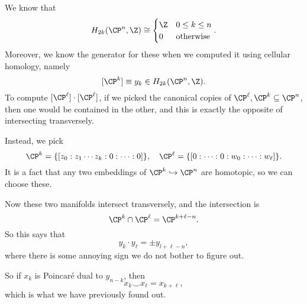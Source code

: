 \documentclass[a4paper]{article}
\theoremstyle{definition}
\begin{document}
\begin{eg}
  We know that
  \[
    H_{2k}(\CP^n, \Z) \cong
    \begin{cases}
      \Z & 0 \leq k \leq n\\
      0 & \text{otherwise}
    \end{cases}.
  \]
  Moreover, we know the generator for these when we computed it using cellular homology, namely
  \[
    [\CP^k] \equiv y_k \in H_{2k}(\CP^n, \Z).
  \]
  To compute $[\CP^\ell] \cdot [\CP^\ell]$, if we picked the canonical copies of $\CP^\ell, \CP^k \subseteq \CP^n$, then one would be contained in the other, and this is exactly the opposite of intersecting transversely.

  Instead, we pick
  \[
    \CP^k = \{[z_0:z_1 \cdots z_k:0:\cdots:0]\},\quad \CP^\ell = \{[0:\cdots : 0 : w_0 : \cdots : w_\ell]\}.
  \]
  It is a fact that any two embeddings of $\CP^k \hookrightarrow \CP^n$ are homotopic, so we can choose these.

  Now these two manifolds intersect transversely, and the intersection is
  \[
    \CP^k \cap \CP^\ell = \CP^{k + \ell - n}.
  \]
  So this says that
  \[
    y_k \cdot y_\ell = \pm y_{l + \ell - n},
  \]
  where there is some annoying sign we do not bother to figure out.

  So if $x_k$ is Poincar\'e dual to $y_{n - k}$, then
  \[
    x_k \smile x_\ell = x_{k + \ell},
  \]
  which is what we have previously found out.
\end{eg}
\end{document}
